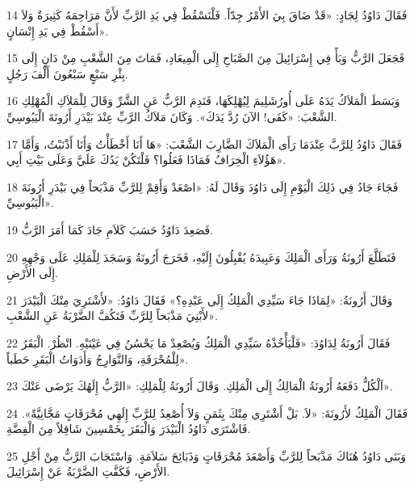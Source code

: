 \par 14 فَقَالَ دَاوُدُ لِجَادٍ: «قَدْ ضَاقَ بِيَ الأَمْرُ جِدّاً. فَلْنَسْقُطْ فِي يَدِ الرَّبِّ لأَنَّ مَرَاحِمَهُ كَثِيرَةٌ وَلاَ أَسْقُطْ فِي يَدِ إِنْسَانٍ».
\par 15 فَجَعَلَ الرَّبُّ وَبَأً فِي إِسْرَائِيلَ مِنَ الصَّبَاحِ إِلَى الْمِيعَادِ، فَمَاتَ مِنَ الشَّعْبِ مِنْ دَانٍ إِلَى بِئْرِ سَبْعٍ سَبْعُونَ أَلْفَ رَجُلٍ.
\par 16 وَبَسَطَ الْمَلاَكُ يَدَهُ عَلَى أُورُشَلِيمَ لِيُهْلِكَهَا، فَنَدِمَ الرَّبُّ عَنِ الشَّرِّ وَقَالَ لِلْمَلاَكِ الْمُهْلِكِ الشَّعْبَ: «كَفَى! الآنَ رُدَّ يَدَكَ». وَكَانَ مَلاَكُ الرَّبِّ عِنْدَ بَيْدَرِ أَرُونَةَ الْيَبُوسِيِّ.
\par 17 فَقَالَ دَاوُدُ لِلرَّبَّ عِنْدَمَا رَأَى الْمَلاَكَ الضَّارِبَ الشَّعْبَ: «هَا أَنَا أَخْطَأْتُ وَأَنَا أَذْنَبْتُ، وَأَمَّا هَؤُلاَءِ الْخِرَافُ فَمَاذَا فَعَلُوا؟ فَلْتَكُنْ يَدُكَ عَلَيَّ وَعَلَى بَيْتِ أَبِي».
\par 18 فَجَاءَ جَادُ فِي ذَلِكَ الْيَوْمِ إِلَى دَاوُدَ وَقَالَ لَهُ: «اصْعَدْ وَأَقِمْ لِلرَّبِّ مَذْبَحاً فِي بَيْدَرِ أَرُونَةَ الْيَبُوسِيِّ».
\par 19 فَصَعِدَ دَاوُدُ حَسَبَ كَلاَمِ جَادَ كَمَا أَمَرَ الرَّبُّ.
\par 20 فَتَطَلَّعَ أَرُونَةُ وَرَأَى الْمَلِكَ وَعَبِيدَهُ يُقْبِلُونَ إِلَيْهِ، فَخَرَجَ أَرُونَةُ وَسَجَدَ لِلْمَلِكِ عَلَى وَجْهِهِ إِلَى الأَرْضِ.
\par 21 وَقَالَ أَرُونَةُ: «لِمَاذَا جَاءَ سَيِّدِي الْمَلِكُ إِلَى عَبْدِهِ؟» فَقَالَ دَاوُدُ: «لأَشْتَرِيَ مِنْكَ الْبَيْدَرَ لأَبْنِيَ مَذْبَحاً لِلرَّبِّ فَتَكُفَّ الضَّرْبَةُ عَنِ الشَّعْبِ».
\par 22 فَقَالَ أَرُونَةُ لِدَاوُدَ: «فَلْيَأْخُذْهُ سَيِّدِي الْمَلِكُ وَيُصْعِدْ مَا يَحْسُنُ فِي عَيْنَيْهِ. انْظُرْ. الْبَقَرُ لِلْمُحْرَقَةِ، وَالنَّوَارِجُ وَأَدَوَاتُ الْبَقَرِ حَطَباً».
\par 23 اَلْكُلُّ دَفَعَهُ أَرُونَةُ الْمَالِكُ إِلَى الْمَلِكِ. وَقَالَ أَرُونَةُ لِلْمَلِكِ: «الرَّبُّ إِلَهُكَ يَرْضَى عَنْكَ».
\par 24 فَقَالَ الْمَلِكُ لأَرُونَةَ: «لاَ. بَلْ أَشْتَرِي مِنْكَ بِثَمَنٍ وَلاَ أُصْعِدُ لِلرَّبِّ إِلَهِي مُحْرَقَاتٍ مَجَّانِيَّةً». فَاشْتَرَى دَاوُدُ الْبَيْدَرَ وَالْبَقَرَ بِخَمْسِينَ شَاقِلاً مِنَ الْفِضَّةِ.
\par 25 وَبَنَى دَاوُدُ هُنَاكَ مَذْبَحاً لِلرَّبِّ وَأَصْعَدَ مُحْرَقَاتٍ وَذَبَائِحَ سَلاَمَةٍ. وَاسْتَجَابَ الرَّبُّ مِنْ أَجْلِ الأَرْضِ، فَكَفَّتِ الضَّرْبَةُ عَنْ إِسْرَائِيلَ.


